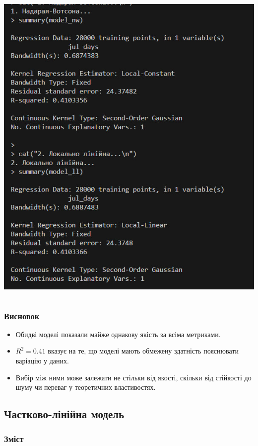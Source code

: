 \documentclass{beamer}
\begin{document}
\begin{frame}
\begin{columns}[T]
\begin{column}{0.48\textwidth}
  \includegraphics[width=\textwidth]{plots/lab4/kernal/40.jpg}
  \end{column}
  \end{columns}
 
\end{frame}


\begin{frame}
  \frametitle{Висновок}
  \begin{itemize}
    \item Обидві моделі показали майже однакову якість за всіма метриками. 
    \item $ R^2 = 0.41 $ вказує на те, що моделі мають обмежену здатність пояснювати варіацію у даних.
    \item Вибір між ними може залежати не стільки від якості, скільки від стійкості до шуму чи переваг у теоретичних властивостях.
  \end{itemize}
\end{frame}


\begin{frame}
  \section{Частково-лінійна модель}

  \frametitle{Зміст}
  \tableofcontents[currentsection]
\end{frame}
\end{document}
